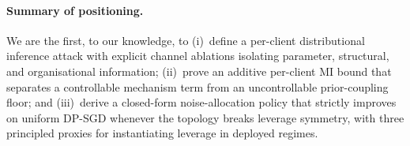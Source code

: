 \paragraph{Summary of positioning.}
We are the first, to our knowledge, to (i)~define a per-client
distributional inference attack with explicit channel ablations
isolating parameter, structural, and organisational information;
(ii)~prove an additive per-client MI bound that separates a
controllable mechanism term from an uncontrollable prior-coupling
floor; and
(iii)~derive a closed-form noise-allocation policy that strictly
improves on uniform DP-SGD whenever the topology breaks leverage
symmetry, with three principled proxies for instantiating leverage
in deployed regimes.
